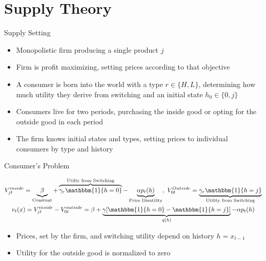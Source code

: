 \documentclass[aspectratio=169,professionalfonts]{beamer}
\begin{document}
\section{Supply Theory}
\begin{frame}{Supply Setting}
  \begin{itemize}
    \item Monopolistic firm producing a single product $j$
    \item Firm is profit maximizing, setting prices according to that objective
    \item A consumer is born into the world with a type $r\in\{H,L\}$, determining how much utility they derive from switching and an initial state $h_0\in\{0,j\}$
    \item Consumers live for two periods, purchasing the inside good or opting for the outside good in each period
    \item The firm knows initial states and types, setting prices to individual consumers by type and history
  \end{itemize}
\end{frame}

\begin{frame}{Consumer's Problem}
  \begin{tcolorbox}[
    boxsep=0pt,
    left=2pt, right=2pt,
    top=1pt, bottom=1pt,
    before skip=2pt, after skip=2pt
    ]
    \setlength{\abovedisplayskip}{2pt}
    \setlength{\belowdisplayskip}{2pt}
    \begin{gather*}
      V^{inside}_{jt} = \underbrace{\beta}_{\text{Constant}} + \overbrace{\gamma_r\mathbbm{1}\{h=0\}}^{\text{Utilty from Switching}} - \underbrace{\alpha p_t(h)}_{\text{Price Disutility}}, \ V^{Outside}_{0t} = \underbrace{\gamma_r\mathbbm{1}\{h=j\}}_{\text{Utility from Switching}} \\
      v_t(x) = V_{jt}^{inside} - V_{0t}^{outside} = \beta + \underbrace{\gamma[\mathbbm{1}\{h=0\} - \mathbbm{1}\{h=j\}]}_{q(h)} - \alpha p_t(h)
    \end{gather*}
  \end{tcolorbox}
  \begin{itemize}\setlength{\itemsep}{2pt}
    \item Prices, set by the firm, and switching utility depend on history $h=x_{t-1}$
    \item Utility for the outside good is normalized to zero
  \end{itemize}
\end{frame}
\end{document}

